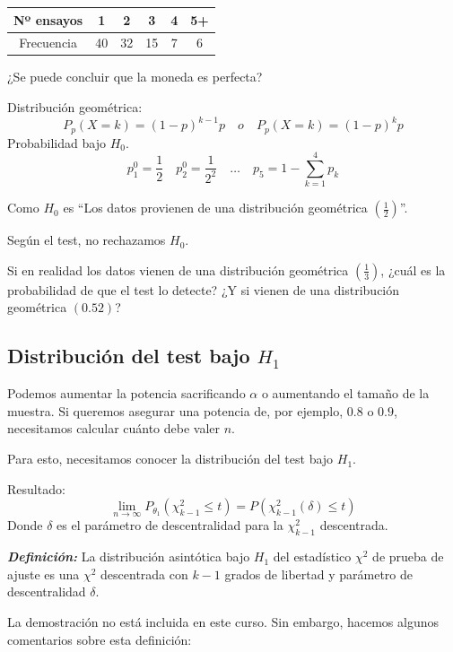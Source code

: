 \begin{table}[!h]
    \centering
    \begin{tabular}{|c|c|c|c|c|c|}
        \hline
        {Nº ensayos} & 1 & 2 & 3 & 4 & 5+ \\ \hline
        {Frecuencia} & 40 & 32 & 15 & 7 & 6 \\ \hline
    \end{tabular}
\end{table}

¿Se puede concluir que la moneda es perfecta?

Distribución geométrica:
\[
    P_p(X=k)=(1-p)^{k-1}p \quad o \quad P_p(X=k)=(1-p)^{k}p
\]
Probabilidad bajo $H_0$.
\[
    p_1^0=\frac{1}{2} \quad p_2^0=\frac{1}{2^2} \quad \dots \quad p_5=1-\sum_{k=1}^{4} p_k
\]

Como $H_0$ es ``Los datos provienen de una distribución geométrica $\left(\frac{1}{2}\right)$''.

Según el test, no rechazamos $H_0$.

Si en realidad los datos vienen de una distribución geométrica $\left(\frac{1}{3}\right)$,  
¿cuál es la probabilidad de que el test lo detecte?  
¿Y si vienen de una distribución geométrica $(0.52)$?

\subsection{Distribución del test bajo $H_1$}

Podemos aumentar la potencia sacrificando $\alpha$ o aumentando el tamaño de la muestra.  
Si queremos asegurar una potencia de, por ejemplo, $0.8$ o $0.9$, necesitamos calcular cuánto debe valer $n$.

Para esto, necesitamos conocer la distribución del test bajo $H_1$.

Resultado:
\[
\lim_{n \to \infty} P_{\theta_1} (\chi^2_{k-1} \leq t) = P(\chi^2_{k-1}(\delta) \leq t)
\]
Donde $\delta$ es el parámetro de descentralidad para la $\chi^2_{k-1}$ descentrada.

\textit{\textbf{Definición:}} La distribución asintótica bajo $H_1$ del estadístico $\chi^2$ de prueba de ajuste es una $\chi^2$ descentrada con $k-1$ grados de libertad y parámetro de descentralidad $\delta$.

La demostración no está incluida en este curso. Sin embargo, hacemos algunos comentarios sobre esta definición:


